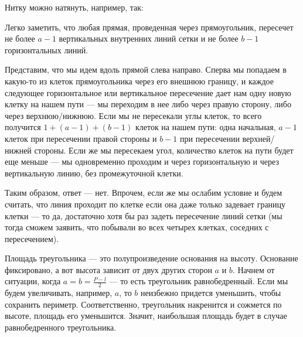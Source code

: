 ﻿
\begin{itemize}
\itA Нитку можно натянуть, например, так:

\begin{center}\end{center}

\itB Легко заметить, что любая прямая, проведенная через прямоугольник, пересечет не более $a-1$
вертикальных внутренних линий сетки и не более $b-1$ горизонтальных линий. 

Представим, что мы идем вдоль прямой слева направо. Сперва мы попадаем в какую-то из клеток прямоугольника через его внешнюю границу, и каждое следующее горизонтальное или вертикальное пересечение дает нам одну новую клетку на нашем пути --- мы переходим в нее либо через правую сторону, либо через верхнюю/нижнюю. Если мы не пересекали углы клеток, то всего получится $1 + (a-1) + (b-1)$ клеток на нашем пути: одна начальная, $a-1$ клеток при пересечении правой стороны и $b-1$ при пересечении верхней/нижней стороны. Если же мы пересекаем угол, количество клеток на пути будет еще меньше --- мы одновременно проходим и через горизонтальную и через вертикальную линию, без промежуточной клетки.

Таким образом, ответ --- нет. Впрочем, если же мы ослабим условие и будем считать, что линия проходит по клетке если она даже только задевает границу клетки --- то да, достаточно хотя бы раз задеть пересечение линий сетки (мы тогда сможем заявить, что побывали во всех четырех клетках, соседних с пересечением). 

\itC Площадь треугольника --- это полупроизведение основания на высоту. Основание фиксировано, а вот
высота зависит от двух других сторон $a$ и $b$. Начнем от ситуации, когда $a = b = \frac{P-l}{2}$ --- то есть треугольник равнобедренный. Если мы будем увеличивать, например, $a$, то $b$ неизбежно придется уменьшить,
чтобы сохранить периметр. Соответственно, треугольник накренится и сожмется по высоте, площадь его уменьшится.
Значит, наибольшая площадь будет в случае равнобедренного треугольника.


\end{itemize}

